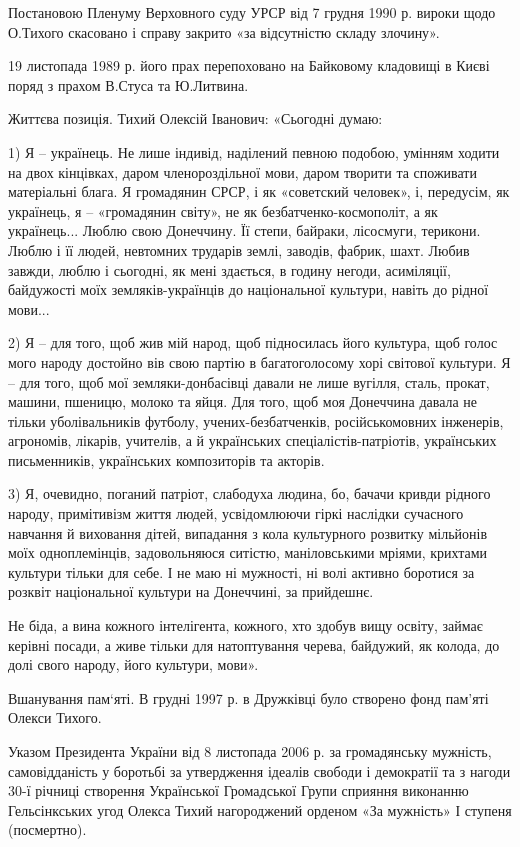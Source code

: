 Постановою Пленуму Верховного суду УРСР від 7 грудня 1990 р. вироки щодо
О.Тихого скасовано і справу закрито «за відсутністю складу злочину».

19 листопада 1989 р. його прах перепоховано на Байковому кладовищі в Києві
поряд з прахом В.Стуса та Ю.Литвина.

Життєва позиція. Тихий Олексій Іванович: «Сьогодні думаю: 

1) Я – українець. Не лише індивід, наділений певною подобою, умінням ходити на
двох кінцівках, даром членороздільної мови, даром творити та споживати
матеріальні блага. Я громадянин СРСР, і як «советский человек», і, передусім,
як українець, я – «громадянин світу», не як безбатченко-космополіт, а як
українець... Люблю свою Донеччину. Її степи, байраки, лісосмуги, терикони.
Люблю і її людей, невтомних трударів землі, заводів, фабрик, шахт. Любив
завжди, люблю і сьогодні, як мені здається, в годину негоди, асиміляції,
байдужості моїх земляків-українців до національної культури, навіть до рідної
мови...

2) Я – для того, щоб жив мій народ, щоб підносилась його культура, щоб голос
мого народу достойно вів свою партію в багатоголосому хорі світової культури. Я
– для того, щоб мої земляки-донбасівці давали не лише вугілля, сталь, прокат,
машини, пшеницю, молоко та яйця. Для того, щоб моя Донеччина давала не тільки
уболівальників футболу, учених-безбатченків, російськомовних інженерів,
агрономів, лікарів, учителів, а й українських спеціалістів-патріотів,
українських письменників, українських композиторів та акторів.

3) Я, очевидно, поганий патріот, слабодуха людина, бо, бачачи кривди рідного
народу, примітивізм життя людей, усвідомлюючи гіркі наслідки сучасного навчання
й виховання дітей, випадання з кола культурного розвитку мільйонів моїх
одноплемінців, задовольняюся ситістю, маніловськими мріями, крихтами культури
тільки для себе. І не маю ні мужності, ні волі активно боротися за розквіт
національної культури на Донеччині, за прийдешнє.

Не біда, а вина кожного інтелігента, кожного, хто здобув вищу освіту, займає
керівні посади, а живе тільки для натоптування черева, байдужий, як колода, до
долі свого народу, його культури, мови».

Вшанування пам`яті. В грудні 1997 р. в Дружківці було створено фонд пам'яті
Олекси Тихого.

Указом Президента України від 8 листопада 2006 р. за громадянську мужність,
самовідданість у боротьбі за утвердження ідеалів свободи і демократії та з
нагоди 30-ї річниці створення Української Громадської Групи сприяння виконанню
Гельсінкських угод Олекса Тихий нагороджений орденом «За мужність» І ступеня
(посмертно).


